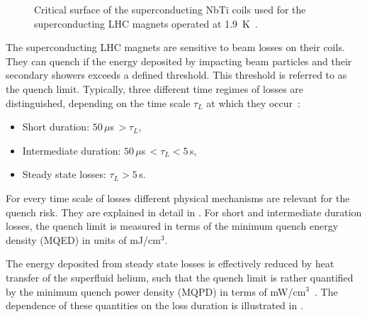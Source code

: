 \begin{figure}[t]
  \centering
  \caption{Critical surface of the superconducting NbTi coils used for the superconducting LHC magnets operated at 1.9~K~\cite{courier2013_quench}.}  
  \label{pic:16070401}
  \end{figure}

The superconducting LHC magnets are sensitive to beam losses on their coils. They can quench if the energy deposited by impacting beam particles and their secondary showers exceeds a defined threshold. This threshold is referred to as the quench limit. Typically, three different time regimes of losses are distinguished, depending on the time scale $\tau_L$ at which they occur~\cite{PhysRevSTAB.18.061002}:
\begin{itemize}
  \item Short duration: $50\,\mu$s$\,>\tau_L$,
  \item Intermediate duration: $50\,\mu$s$\,<\tau_L< 5\,$s,
  \item Steady state losses: $\tau_L>5\,$s.
\end{itemize}
For every time scale of losses different physical mechanisms are relevant for the quench risk. They are explained in detail in \cite{PhysRevSTAB.18.061002}. For short and intermediate duration losses, the quench limit is measured in terms of the minimum quench energy density (MQED) in units of mJ/cm$^3$. 

The energy deposited from steady state losses is effectively reduced by heat transfer of the superfluid helium, such that the quench limit is rather quantified by the minimum quench power density (MQPD) in terms of mW/cm$^3$~\cite{lhcprojreport44,PhysRevSTAB.18.061002}. The dependence of these quantities on the loss duration is illustrated in .

